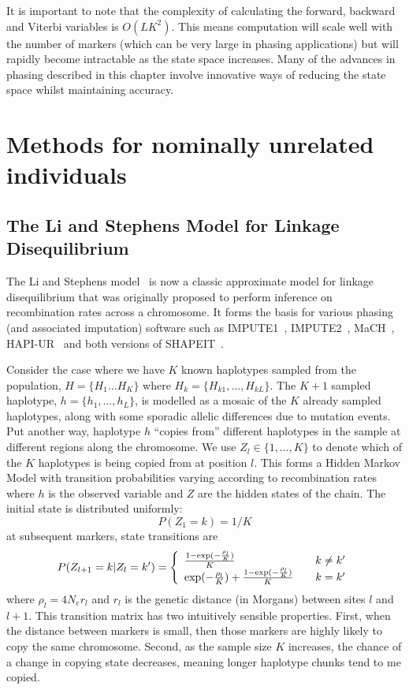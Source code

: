 It is important to note that the complexity of calculating the forward, backward and Viterbi variables is $O(LK^2)$.  This means computation will scale well with the number of markers (which can be very large in phasing applications) but will rapidly become intractable as the state space increases. Many of the advances in phasing described in this chapter involve innovative ways of reducing the state space whilst maintaining accuracy.


\section{Methods for nominally unrelated individuals}
\label{chap3:unrelated}
\subsection{The Li and Stephens Model for Linkage Disequilibrium}
\label{chap3:liandstephens}
The Li and Stephens model~\citep{li2003model} is now a classic approximate model for linkage disequilibrium that was originally proposed to perform inference on recombination rates across a chromosome.  It forms the basis for various phasing (and associated imputation) software such as IMPUTE1~\citep{marchini2007new}, IMPUTE2~\citep{howie2009flexible}, MaCH~\citep{li2010mach}, HAPI-UR~\citep{williams2012phasing} and both versions of SHAPEIT~\citep{delaneau2013,delaneau2011linear}.

Consider the case where we have $K$ known haplotypes sampled from the population, $H =\{H_1 \ldots H_K\}$ where $H_k=\{H_{k1},\ldots,H_{kL}\}$.  The $K+1$ sampled haplotype, $h=\{h_1,\ldots,h_L\}$, is modelled as a mosaic of the $K$ already sampled haplotypes, along with some sporadic allelic differences due to mutation events. Put another way, haplotype $h$ ``copies from'' different haplotypes in the sample at different regions along the chromosome. We use $Z_l \in \{1,\ldots,K\}$  to denote which of the $K$ haplotypes is being copied from at position $l$.  This forms a Hidden Markov Model with transition probabilities varying according to recombination rates where $h$ is the observed variable and $Z$ are the hidden states of the chain. The initial state is distributed uniformly:
$$P(Z_1=k) = 1/K$$
at subsequent markers, state transitions are
\[ P(Z_{l+1}=k|Z_l=k')  = \left\{ 
  \begin{array}{l l}
    \frac{1-\exp(-\frac{\rho_l}{K})}{K} & \quad k \neq k'\\
    \exp(-\frac{\rho_l}{K}) + \frac{1-\exp(-\frac{\rho_l}{K})}{K} & \quad k = k'
  \end{array}  \label{chap3:listephentrans}
  \right.\]
where $\rho_l = 4N_er_l$ and $r_l$ is the genetic distance (in Morgans) between sites $l$ and $l+1$. This transition matrix has two intuitively sensible properties. First, when the distance between markers is small, then those markers are highly likely to copy the same chromosome. Second, as the sample size $K$ increases, the chance of a change in copying state decreases, meaning longer haplotype chunks tend to me copied.

